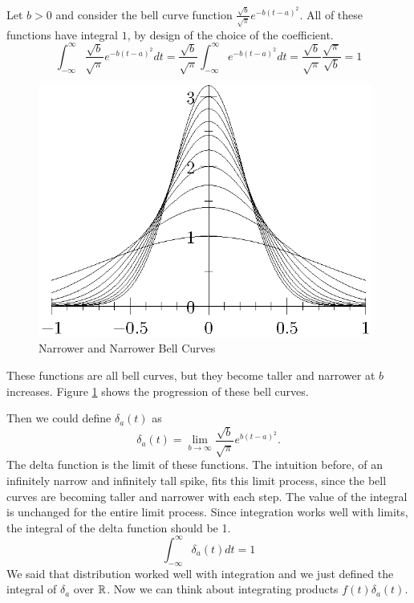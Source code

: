 \documentclass[fleqn,letterpaper]{report}
\begin{document}
Let $b > 0$ and consider the bell curve function
$\frac{\sqrt{b}}{\sqrt{\pi}} e^{-b(t-a)^2}$. All of these
functions have integral $1$, by design of the choice of the
coefficient.
\begin{equation*}
\int_{-\infty}^\infty \frac{\sqrt{b}}{\sqrt{\pi}} e^{-b(t-a)^2} dt =
\frac{\sqrt{b}}{\sqrt{\pi}} \int_{-\infty}^\infty e^{-b(t-a)^2} dt =
\frac{\sqrt{b}}{\sqrt{\pi}} \frac{ \sqrt{\pi}}{\sqrt{b}} = 1
\end{equation*}

\begin{figure}[t]
\centering
\includegraphics[width=11cm]{figure23.eps}
\caption{Narrower and Narrower Bell Curves}
\label{figure-bell-curves}
\end{figure}

These functions are all bell curves, but they become taller
and narrower at $b$ increases. Figure \ref{figure-bell-curves} shows
the progression of these bell curves.

Then we could define $\delta_a(t)$ as 
\begin{equation*}
\delta_a(t) = \lim_{b \rightarrow \infty}
\frac{\sqrt{b}}{\sqrt{\pi}} e^{b(t-a)^2}.
\end{equation*}
The delta function is the limit of these functions. The
intuition before, of an infinitely narrow and infinitely tall
spike, fits this limit process, since the bell curves are
becoming taller and narrower with each step.  The value of the
integral is unchanged for the entire limit process.
Since integration works well with limits, the integral of the
delta function should be 1.
\begin{equation*}
\int_{-\infty}^\infty \delta_a(t) dt = 1
\end{equation*}
We said that distribution worked well with integration and we
just defined the integral of $\delta_a$ over $\mathbb{R}$. Now
we can think about integrating products $f(t) \delta_a(t)$.
\end{document}
